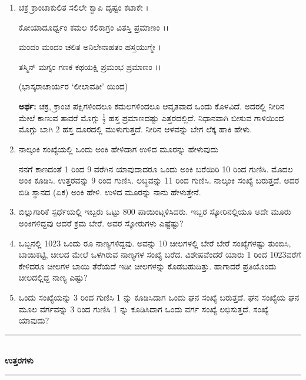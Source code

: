 \begin{enumerate}
\item ಚಕ್ರ ಕ್ರಾಂಚಾಕುಲಿತ ಸಲಿಲೇ ಕ್ವಾಪಿ ದೃಷ್ಟಂ ಕಟಾಕೇ । 

ಕೋಯಾದೂರ್ಧ್ವಂ ಕಮಲ ಕಲಿಕಾಗ್ರಂ ವಿತಸ್ತಿ ಪ್ರಮಾಣಂ ।।

ಮಂದಂ ಮಂದಂ ಚಲಿತ ಅನಿಲೇನಾಹತಂ ಹಸ್ತಯುಗ್ಮೇ ।

ತಸ್ಮಿನ್ ಮಗ್ನಂ ಗಣಕ ಕಥಯಕ್ಷಿ ಪ್ರಮಂಭ ಪ್ರಮಾಣಂ ।।

\smallskip
\hfill (ಭಾಸ್ಕರಾಚಾರ್ಯರ `ಲೀಲಾವತೀ' ಯಿಂದ)

\smallskip
{\bf ಅರ್ಥ:} ಚಕ್ರ, ಕ್ರಾಂಚ ಪಕ್ಷಿಗಳಿಂದಲೂ ಕಮಲಗಳಿಂದಲೂ ಆವೃತವಾದ ಒಂದು ಕೊಳವಿದೆ. ಅದರಲ್ಲಿ ನೀರಿನ ಮೇಲೆ ಕಾಣುವ ತಾವರೆ ಮೊಗ್ಗು $\frac{1}{2}$ ಹಸ್ತ ಪ್ರಮಾಣದಷ್ಟು ಎತ್ತರದಲ್ಲಿದೆ. ನಿಧಾನವಾಗಿ ಬೀಸುವ ಗಾಳಿಯಿಂದ ಮೊಗ್ಗು ಬಾಗಿ 2 ಹಸ್ತ ದೂರದಲ್ಲಿ ಮುಳುಗುತ್ತದೆ. ನೀರಿನ ಆಳವನ್ನು ಬೇಗ ಲೆಕ್ಕ ಹಾಕಿ ಹೇಳು. 

\item ನಾಲ್ಕಂಕಿ ಸಂಖ್ಯೆಯಲ್ಲಿ ಒಂದು ಅಂಕಿ ಹೇಳಿದಾಗ ಉಳಿದ ಮೂರನ್ನು ಹೇಳುವುದು 

ನನಗೆ ಕಾಣದಂತೆ 1 ರಿಂದ 9 ವರೆಗಿನ ಯಾವುದಾದರೂ ಒಂದು ಅಂಕಿ ಬರೆಯಿರಿ 10 ರಿಂದ ಗುಣಿಸಿ. ಮೊದಲ ಅಂಕಿ ಕೂಡಿಸಿ. ಉತ್ತರವನ್ನು 9 ರಿಂದ ಗುಣಿಸಿ. ಲಬ್ಧವನ್ನು 11 ರಿಂದ ಗುಣಿಸಿ. ನಾಲ್ಕಂಕಿ ಸಂಖ್ಯೆ ಬರುತ್ತದೆ. ಅದರ ಬಿಡಿ ಸ್ಥಾನದ (ಏಕ) ಅಂಕಿ ಹೇಳಿ. ಉಳಿದ ಮೂರನ್ನು ನಾನು ಹೇಳುತ್ತೇನೆ.

\item ಬಿಲ್ಲುಗಾರಿಕೆ ಸ್ಪರ್ಧೆಯಲ್ಲಿ ಇಬ್ಬರು ಒಟ್ಟು 800 ಪಾಯಿಂಟ್ಗಳಿಸಿದರು. ಇಬ್ಬರ ಸ್ಕೋರಿನಲ್ಲಿಯೂ ಅದೇ ಮೂರು ಅಂಕಿಗಳಿದ್ದವು ಆದರೆ ಕ್ರಮ ಬೇರೆ. ಅವರ ಸ್ಕೋರುಗಳು ಎಷ್ಟೆಷ್ಟು? 

\item ಒಬ್ಬನಲ್ಲಿ 1023 ಒಂದು ರೂ ನಾಣ್ಯಗಳಿದ್ದವು. ಅವನ್ನು 10 ಚೀಲಗಳಲ್ಲಿ ಬೇರೆ ಬೇರೆ ಸಂಖ್ಯೆಗಳಷ್ಟು ತುಂಬಿಸಿ, ಬಾಯಿಕಟ್ಟಿ, ಚೀಲದ ಮೇಲೆ ಒಳಗಿರುವ ನಾಣ್ಯಗಳ ಸಂಖ್ಯೆ ಬರೆದ. ವಿಶೇಷವೆಂದರೆ ಯಾರು 1 ರಿಂದ 1023ವರೆಗೆ ಕೇಳಿದರೂ ಚೀಲಗಳ ಬಾಯಿ ತೆರೆಯದೆ ಇಡೀ ಚೀಲಗಳನ್ನು ಕೊಡಬಹುದಿತ್ತು. ಹಾಗಾದರೆ ಪ್ರತಿಯೊಂದು ಚೀಲದಲ್ಲಿದ್ದ ನಾಣ್ಯ ಎಷ್ಟು? 

\item ಒಂದು ಸಂಖ್ಯೆಯನ್ನು 3 ರಿಂದ ಗುಣಿಸಿ 1 ನ್ನು ಕೂಡಿಸಿದಾಗ ಒಂದು ಘನ ಸಂಖ್ಯೆ ಬರುತ್ತದೆ. ಘನ ಸಂಖ್ಯೆಯ ಘನ ಮೂಲ ವರ್ಗವನ್ನು 3 ರಿಂದ ಗುಣಿಸಿ 1 ನ್ನು ಕೂಡಿಸಿದಾಗ ಒಂದು ವರ್ಗ ಸಂಖ್ಯೆ ಲಭಿಸುತ್ತದೆ. ಸಂಖ್ಯೆ ಯಾವುದು?
\end{enumerate}

\smallskip

\begin{center}
\rule{5cm}{1pt}\\[3pt]
{\Large\bfseries ಉತ್ತರಗಳು}\\[-0.1cm]
\rule{5cm}{1pt}
\end{center}

